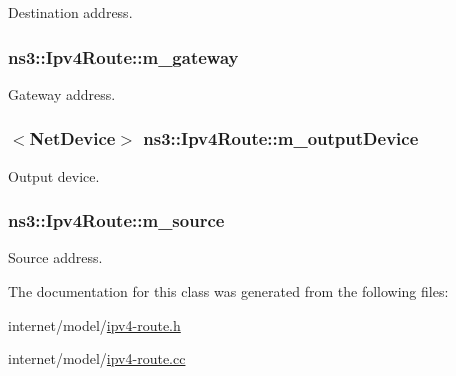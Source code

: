 Destination address. 

\subsubsection[{\texorpdfstring{m\+\_\+gateway}{m_gateway}}]{ ns3\+::\+Ipv4\+Route\+::m\+\_\+gateway\hspace{0.3cm}{\ttfamily [private]}}\hypertarget{classns3_1_1Ipv4Route_a6b98415c6589abd13c79139a867fdfc3}{}\label{classns3_1_1Ipv4Route_a6b98415c6589abd13c79139a867fdfc3}


Gateway address. 

\subsubsection[{\texorpdfstring{m\+\_\+output\+Device}{m_outputDevice}}]{$<${\bf Net\+Device}$>$ ns3\+::\+Ipv4\+Route\+::m\+\_\+output\+Device\hspace{0.3cm}{\ttfamily [private]}}\hypertarget{classns3_1_1Ipv4Route_aaabe4495a5c4425d018d79b5fec1ba0c}{}\label{classns3_1_1Ipv4Route_aaabe4495a5c4425d018d79b5fec1ba0c}


Output device. 

\subsubsection[{\texorpdfstring{m\+\_\+source}{m_source}}]{ ns3\+::\+Ipv4\+Route\+::m\+\_\+source\hspace{0.3cm}{\ttfamily [private]}}\hypertarget{classns3_1_1Ipv4Route_a261c5b08cf839944a45c7e1523e7433b}{}\label{classns3_1_1Ipv4Route_a261c5b08cf839944a45c7e1523e7433b}


Source address. 



The documentation for this class was generated from the following files\+:\begin{DoxyCompactItemize}
\item 
internet/model/\hyperlink{ipv4-route_8h}{ipv4-\/route.\+h}\item 
internet/model/\hyperlink{ipv4-route_8cc}{ipv4-\/route.\+cc}\end{DoxyCompactItemize}
